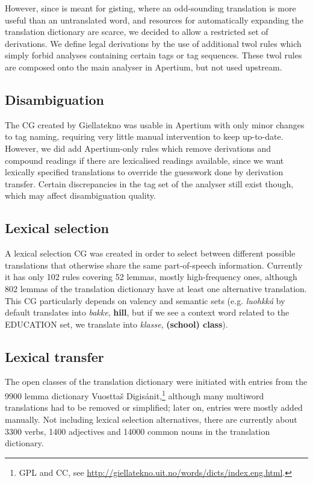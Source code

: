 However, since \smenob{} is meant for gisting, where an odd-sounding
translation is more useful than an untranslated word, and resources
for automatically expanding the translation dictionary are scarce, we
decided to allow a restricted set of derivations. We define legal
derivations by the use of additional twol rules which simply forbid
analyses containing certain tags or tag sequences. These twol rules
are composed onto the main analyser in Apertium, but not used
upstream.

\subsection{Disambiguation}
The CG created by Giellatekno was usable in Apertium with only minor
changes to tag naming, requiring very little manual intervention to
keep up-to-date. However, we did add Apertium-only rules which remove
derivations and compound readings if there are lexicalised readings
available, since we want lexically specified translations to override
the guesswork done by derivation transfer. Certain discrepancies in
the tag set of the analyser still exist though, which may affect
disambiguation quality.

\subsection{Lexical selection}
A lexical selection CG was created in order to select between
different possible translations that otherwise share the same
part-of-speech information. Currently it has only 102 rules covering
52 lemmas, mostly high-frequency ones, although 802 lemmas of the
translation dictionary have at least one alternative translation. This
CG particularly depends on valency and semantic sets (e.g.
\textit{luohkká} by default translates into \textit{bakke},
\textbf{hill}, but if we see a context word related to the
\textsc{EDUCATION} set, we translate into \textit{klasse},
\textbf{(school) class}).


\subsection{Lexical transfer}
The open classes of the translation dictionary were initiated with entries
from the 9900 lemma dictionary Vuostta\v{s} Digis\'{a}nit,\footnote{GPL and CC,
  see
  \href{http://giellatekno.uit.no/words/dicts/index.eng.html}{http://giellatekno.uit.no/words/dicts/index.eng.html}.}
although many multiword translations had to be removed or simplified;
later on, entries were mostly added manually. Not including lexical
selection alternatives, there are currently about 3300 verbs, 1400
adjectives and 14000 common nouns in the translation dictionary.

